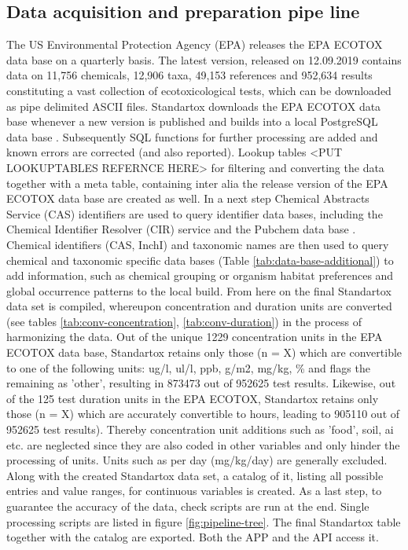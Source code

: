 \subsection*{Data acquisition and preparation pipe line}
The US Environmental Protection Agency (EPA) releases the EPA ECOTOX data base on a quarterly basis. The latest version, released on 12.09.2019 contains data on 11,756 chemicals, 12,906 taxa, 49,153 references and 952,634 results \citep{usepa_ecotox_2019} constituting a vast collection of ecotoxicological tests, which can be downloaded as pipe delimited ASCII files. Standartox downloads the EPA ECOTOX data base whenever a new version is published and builds into a local PostgreSQL data base \citep{szocs_build_2019}. Subsequently SQL functions for further processing are added and known errors are corrected (and also reported). Lookup tables <PUT LOOKUPTABLES REFERNCE HERE> for filtering and converting the data together with a meta table, containing inter alia the release version of the EPA ECOTOX data base are created as well. In a next step Chemical Abstracts Service (CAS) identifiers are used to query identifier data bases, including the Chemical Identifier Resolver (CIR) service \citep{nationalinstitutesofhealthnih_chemical_2019} and the Pubchem data base \citep{kim_pubchem_2016}. Chemical identifiers (CAS, InchI) and taxonomic names are then used to query chemical and taxonomic specific data bases (Table \ref{tab:data-base-additional}) to add information, such as chemical grouping or organism habitat preferences and global occurrence patterns to the local build. From here on the final Standartox data set is compiled, whereupon concentration and duration units are converted (see tables \ref{tab:conv-concentration}, \ref{tab:conv-duration}) in the process of harmonizing the data. Out of the unique 1229 concentration units in the EPA ECOTOX data base, Standartox retains only those (n = X) which are convertible to one of the following units: ug/l, ul/l, ppb, g/m2, mg/kg, \% and flags the remaining as 'other', resulting in 873473 out of 952625 test results. Likewise, out of the 125 test duration units in the EPA ECOTOX, Standartox retains only those (n = X) which are accurately convertible to hours, leading to 905110 out of 952625 test results). Thereby concentration unit additions such as 'food', soil, ai etc. are neglected since they are also coded in other variables and only hinder the processing of units. Units such as per day (mg/kg/day) are generally excluded. Along with the created Standartox data set, a catalog of it, listing all possible entries and value ranges, for continuous variables is created. As a last step, to guarantee the accuracy of the data, check scripts are run at the end. Single processing scripts are listed in figure \ref{fig:pipeline-tree}. The final Standartox table together with the catalog are exported. Both the APP and the API access it.




